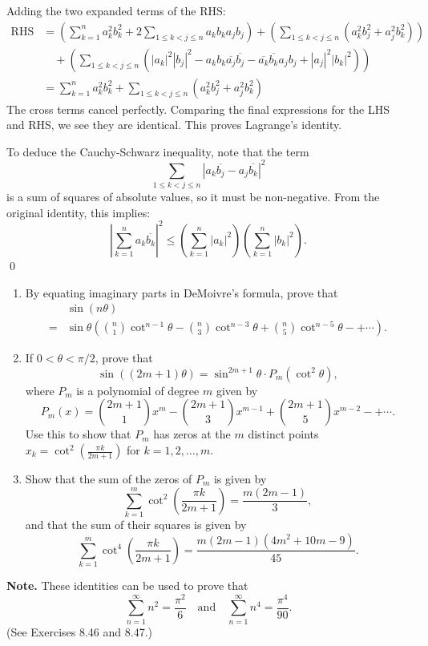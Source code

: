 Adding the two expanded terms of the RHS:
\begin{align*}
\text{RHS} &= \left( \sum_{k=1}^n a_k^2 b_k^2 + 2 \sum_{1 \leq k < j \leq n} a_k b_k a_j b_j \right) + \left( \sum_{1 \leq k < j \leq n} (a_k^2 b_j^2 + a_j^2 b_k^2) \right) \\
&\quad + \left( \sum_{1 \leq k < j \leq n} (|a_k|^2 |b_j|^2 - a_k b_k \overline{a_j} \overline{b_j} - \overline{a_k} \overline{b_k} a_j b_j + |a_j|^2 |b_k|^2) \right) \\
&= \sum_{k=1}^n a_k^2 b_k^2 + \sum_{1 \leq k < j \leq n} (a_k^2 b_j^2 + a_j^2 b_k^2)
\end{align*}
The cross terms cancel perfectly. Comparing the final expressions for the LHS and RHS, we see they are identical. This proves Lagrange's identity.

To deduce the Cauchy-Schwarz inequality, note that the term $$\sum_{1 \leq k < j \leq n} |a_k \overline{b_j} - a_j \overline{b_k}|^2$$ is a sum of squares of absolute values, so it must be non-negative. From the original identity, this implies:
\[ \left| \sum_{k=1}^n a_k \overline{b_k} \right|^2 \leq \left( \sum_{k=1}^n |a_k|^2 \right) \left( \sum_{k=1}^n |b_k|^2 \right). \]\qed


\begin{problembox}
\begin{enumerate}[label=\textbf{(\alph*)}]
\item By equating imaginary parts in DeMoivre's formula, prove that
\begin{align*}
&\sin(n\theta) \\
=& \sin \theta \left( \binom{n}{1} \cot^{n-1} \theta - \binom{n}{3} \cot^{n-3} \theta + \binom{n}{5} \cot^{n-5} \theta - + \cdots \right).
\end{align*}
\item If \( 0 < \theta < \pi/2 \), prove that
\[
\sin((2m+1)\theta) = \sin^{2m+1} \theta \cdot P_m(\cot^2 \theta),
\]
where \( P_m \) is a polynomial of degree \( m \) given by
\[
P_m(x) = \binom{2m+1}{1} x^m - \binom{2m+1}{3} x^{m-1} + \binom{2m+1}{5} x^{m-2} - +\cdots.
\]
Use this to show that \( P_m \) has zeros at the \( m \) distinct points \( x_k = \cot^2 \left( \frac{\pi k}{2m+1} \right) \) for \( k = 1, 2, \dots, m \).
\item Show that the sum of the zeros of \( P_m \) is given by
\[
\sum_{k=1}^m \cot^2 \left( \frac{\pi k}{2m+1} \right) = \frac{m(2m-1)}{3},
\]
and that the sum of their squares is given by
\[
\sum_{k=1}^m \cot^4 \left( \frac{\pi k}{2m+1} \right) = \frac{m(2m-1)(4m^2 + 10m - 9)}{45}.
\]
\end{enumerate}
\textbf{Note.} These identities can be used to prove that
\[
\sum_{n=1}^\infty n^2 = \frac{\pi^2}{6} \quad \text{and} \quad \sum_{n=1}^\infty n^4 = \frac{\pi^4}{90}.
\]
(See Exercises 8.46 and 8.47.)
\end{problembox}

